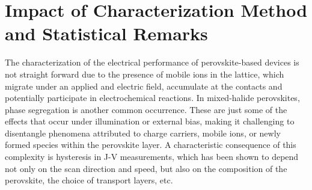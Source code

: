 \section{Impact of Characterization Method and Statistical Remarks}

The characterization of the electrical performance of perovskite-based devices is not straight forward due to the presence of mobile ions in the lattice, which migrate under an applied and electric field, accumulate at the contacts and potentially participate in electrochemical reactions. In mixed-halide perovskites, phase segregation is another common occurrence. These are just some of the effects that occur under illumination or external bias, making it challenging to disentangle phenomena attributed to charge carriers, mobile ions, or newly formed species within the perovskite layer. A characteristic consequence of this complexity is hysteresis in J-V measurements, which has been shown to depend not only on the scan direction and speed, but also on the composition of the perovskite, the choice of transport layers, etc. 

